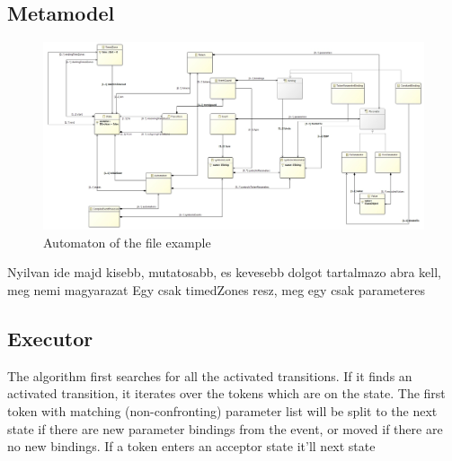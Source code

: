 		\subsection{Metamodel}
		
			\begin{figure}[h]
			\centering
			\includegraphics[width=0.9\linewidth]{include/figures/chapter_5/model}
			\caption{Automaton of the file example}
			\label{fig:cep:model}
			\end{figure}
		Nyilvan ide majd kisebb, mutatosabb, es kevesebb dolgot tartalmazo abra kell, meg nemi magyarazat
		Egy csak timedZones resz, meg egy csak parameteres
		\subsection{Executor}
			The algorithm first searches for all the activated transitions.
			If it finds an activated transition, it iterates over the tokens which are on the state. The first token with matching (non-confronting)
			parameter list will be split to the next state if there are new parameter bindings from the event, or moved if there are no new bindings.
			If a token enters an acceptor state it'll 
			next state 
